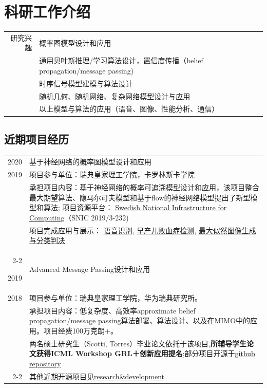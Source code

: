 \documentclass[a4paper,10pt]{article}
\begin{document}
\section{科研工作介绍}
\begin{tabular}{r|p{13cm}}
\textsc{研究兴趣} & 概率图模型设计和应用 \\
&通用贝叶斯推理/学习算法设计，置信度传播（belief propagation/message passing) \\
& 时序信号模型建模与算法设计 \\
& 随机几何、随机网络、复杂网络模型设计与应用 \\
& 以上模型与算法的应用（语音、图像、性能分析、通信）
\end{tabular}

\subsection{近期项目经历}
\begin{tabular}{r|p{13cm}}
\textsc{2020} & 基于神经网络的概率图模型设计和应用\\
\textsc{2019}& 项目参与单位：瑞典皇家理工学院，卡罗林斯卡学院 \\
              & 承担项目内容：基于神经网络的概率可追溯模型设计和应用，该项目整合最大期望算法、隐马尔可夫模型和基于flow的神经网络模型提出了新型模型和算法; 项目资源平台： \href{https://www.snic.se/}{Swedish National Infrastructure for Computing}（SNIC 2019/3-232)\\
	& 项目完成应用与展示： \href{https://github.com/FirstHandScientist/genhmm}{语音识别}, \href{https://arxiv.org/pdf/1910.13904.pdf}{早产儿败血症检测}, \href{https://github.com/FirstHandScientist/classification-EM-GM}{最大似然图像生成与分类判决}\\
  \cline{2-2}

  \textsc{2019}  & Advanced Message Passing设计和应用\\
  \textsc{2018}& 项目参与单位：瑞典皇家理工学院，华为瑞典研究所。\\
              & 承担项目内容：低复杂度、高效率approximate belief propagation/message passing算法部署、算法设计、以及在MIMO中的应用。项目经费100万克朗+。\\
              & 两名硕士研究生（Scotti, Torres）毕业论文依托于该项目,\textbf{所辅导学生论文获得ICML Workshop GRL＋创新应用提名};部分项目开源于\href{https://github.com/FirstHandScientist/amp}{github repository} \\
  \cline{2-2}
  & 其他近期开源项目见\href{https://people.kth.se/~doli/#/research}{research\&development}\\

\end{tabular}
\end{document}
